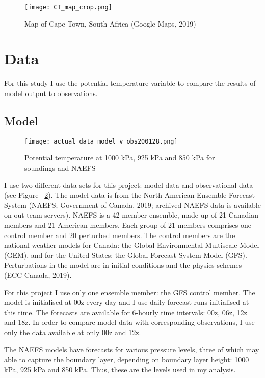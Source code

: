 \documentclass[12pt]{article}
\begin{document}
\begin{figure}[h]
    \centering
    \texttt{[image: CT\_map\_crop.png]}
    \caption{Map of Cape Town, South Africa (Google Maps, 2019)}
    \label{fig:map}
\end{figure}

\section{Data}

For this study I use the potential temperature variable to compare the 
results of model output to observations. 

\subsection{Model}

\begin{figure}[h]
    \centering
    \texttt{[image: actual\_data\_model\_v\_obs200128.png]}
    \caption{Potential temperature at 1000 kPa, 925 kPa and 850 kPa for soundings and NAEFS}
    \label{fig:alldata}
\end{figure}


I use two different data sets for this project: model data and observational data (see Figure ~\ref{fig:alldata}). 
The model data is from the North American Ensemble Forecast System (NAEFS; Government of Canada, 2019; 
archived NAEFS data is available on out team servers). NAEFS is a 42-member ensemble, made up 
of 21 Canadian members and 21 American members. Each group of 21 members comprises one control 
member and 20 perturbed members. The control members are the national weather models for Canada: 
the Global Environmental Multiscale Model (GEM), and for the United States: the Global Forecast 
System Model (GFS). Perturbations in the model are in initial conditions and the physics schemes 
(ECC Canada, 2019). 

For this project I use only one ensemble member: the GFS control member. The model is initialised 
at 00z every day and I use daily forecast runs initialised at this time. The forecasts are 
available for 6-hourly time intervals: 00z, 06z, 12z and 18z. In order to compare model data 
with corresponding observations, I use only the data available at only 00z and 12z. 

The NAEFS models have forecasts for various pressure levels, three of which may able to capture 
the boundary layer, depending on boundary layer height: 1000 kPa, 925 kPa and 850 kPa. Thus, 
these are the levels used in my analysis.
\end{document}
